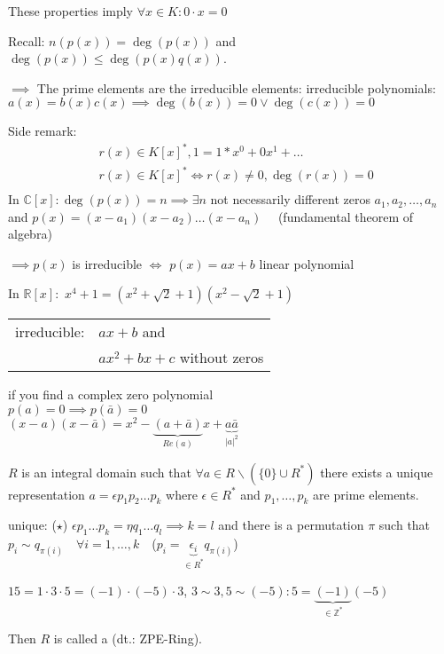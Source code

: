 These properties imply $\forall x \in K: 0\cdot x = 0$

Recall:
$n(p(x)) = \deg(p(x))$ and
$\deg(p(x)) \leq \deg(p(x) q(x))$.

$\implies$ The prime elements are the irreducible elements: irreducible polynomials: $a(x) = b(x)c(x) \implies \deg(b(x))=0 \lor \deg(c(x))=0$

Side remark:
\begin{align*}
  &r(x) \in K[x]^{*}, 1 = 1*x^0 + 0 x^1 + \ldots \\
  &r(x) \in K[x]^{*} \Leftrightarrow r(x) \neq 0, \deg(r(x)) = 0\\
\end{align*}
In $\mathbb{C}[x]:
\deg(p(x)) = n \implies \exists n$ not necessarily different zeros $a_1, a_2, \ldots , a_n$ and $p(x) = (x-a_1)(x-a_2) \ldots (x-a_n) \quad$ (fundamental theorem of algebra)

$\implies p(x)$ is irreducible $\iff$ $p(x) = ax+b$ linear polynomial

In $\mathbb{R}[x]:$
$x^4 + 1 = (x^2 + \sqrt{2} +1)(x^2 - \sqrt{2} + 1)$

\begin{tabular}{ll}
  irreducible:
    & $ax+b$ and \\
    & $ax^2 + bx + c$ without zeros\\
\end{tabular}

if you find a complex zero polynomial \\
$p(a) = 0 \implies p(\bar{a}) = 0$ \\
$(x-a)(x-\bar{a}) = x^2 - \underbrace{(a + \bar{a})}_{Re(a)} x + \underbrace{a\bar{a}}_{|a|^2}$

\begin{definition}
$R$ is an integral domain such that $\forall a \in R \backslash (\{0\} \cup R^{*})$
there exists a unique representation $a = \epsilon p_1 p_2 \ldots p_k$
where $\epsilon \in R^{*}$ and $p_1, \ldots, p_k$ are prime elements.

unique: ($\star$) $\epsilon p_1 \ldots p_k = \eta q_1 \ldots q_l \implies k=l$ and there is a permutation $\pi$ such that
$p_i \sim q_{\pi(i)} \quad \forall i = 1,\ldots, k \quad $($ p_i = \underbrace{\epsilon_i}_{\in R^{*}} q_{\pi(i)} $)

$15 = 1\cdot 3\cdot 5 = (-1) \cdot (-5) \cdot 3$, $ 3 \sim 3, 5 \sim (-5): 5=\underbrace{(-1)}_{\in\mathbb{Z}^{*}} (-5)$

Then $R$ is called a  (dt.: ZPE-Ring).
\end{definition}

